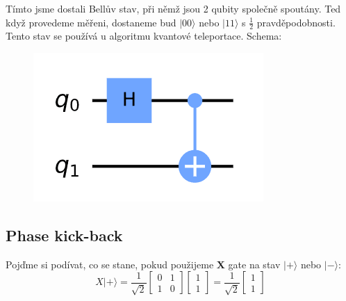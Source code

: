 \documentclass[11pt]{article}
\begin{document}
\par Tímto jsme dostali Bellův stav, při němž jsou 2 qubity společně spoutány.
Ted když provedeme měřeni, dostaneme bud $|00\rangle$ nebo $|11\rangle$ s $\frac{1}{2}$ pravděpodobnosti.
Tento stav se používá u algoritmu kvantové teleportace.
Schema:
\begin{figure}[H]
    \includegraphics[scale=.7]{bell_state_scheme}
    \centering
\end{figure}

\subsection{Phase kick-back}
\label{sec:phase_kickback}
Pojďme si podívat, co se stane, pokud použijeme \textbf{X} gate na stav $|+\rangle$ nebo $|-\rangle$:
$$X|+\rangle = \frac{1}{\sqrt{2}}\begin{bmatrix}
        0 & 1 \\
        1 & 0
    \end{bmatrix} \begin{bmatrix}
        1 \\
        1
    \end{bmatrix} = \frac{1}{\sqrt{2}} \begin{bmatrix}
        1 \\
        1
    \end{bmatrix} $$
\end{document}
